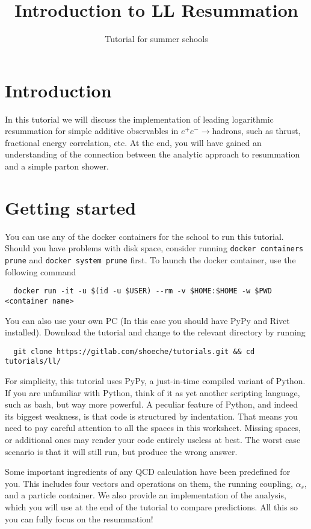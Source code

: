 \documentclass[10pt,fleqn]{scrartcl}
\begin{document}
\title{\vspace*{-2em} Introduction to LL Resummation}
\author{Tutorial for summer schools}
\date{}
\maketitle

\section{Introduction}

In this tutorial we will discuss the implementation of leading logarithmic
resummation for simple additive observables in $e^+e^-\to$hadrons, such as thrust,
fractional energy correlation, etc. At the end, you will have gained an 
understanding of the connection between the analytic approach to resummation
and a simple parton shower.

\section{Getting started}

You can use any of the docker containers for the school to run this tutorial.
Should you have problems with disk space, consider running
{\tt docker containers prune} and {\tt docker system prune} first.
To launch the docker container, use the following command
\begin{verbatim}
  docker run -it -u $(id -u $USER) --rm -v $HOME:$HOME -w $PWD <container name>
\end{verbatim}
You can also use your own PC (In this case you should have PyPy and Rivet installed).
Download the tutorial and change to the relevant directory by running
\begin{verbatim}
  git clone https://gitlab.com/shoeche/tutorials.git && cd tutorials/ll/
\end{verbatim}
For simplicity, this tutorial uses PyPy, a just-in-time compiled variant of Python.
If you are unfamiliar with Python, think of it as yet another scripting language,
such as bash, but way more powerful. A peculiar feature of Python, and indeed its
biggest weakness, is that code is structured by indentation.
That means you need to pay careful attention to all the spaces in this worksheet.
Missing spaces, or additional ones may render your code entirely useless at best.
The worst case scenario is that it will still run, but produce the wrong answer.

Some important ingredients of any QCD calculation have been predefined for you.
This includes four vectors and operations on them, the running
coupling, $\alpha_s$, and a particle container. We also provide an implementation
of the analysis, which you will use at the end of the tutorial to compare
predictions. All this so you can fully focus on the resummation!
\end{document}
